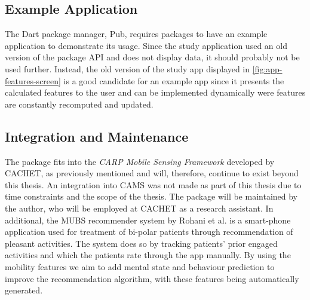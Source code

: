 \subsection{Example Application}
The Dart package manager, Pub, requires packages to have an example application to demonstrate its usage. Since the study application used an old version of the package API and does not display data, it should probably not be used further. Instead, the old version of the study app displayed in \ref{fig:app-features-screen} is a good candidate for an example app since it presents the calculated features to the user and can be implemented dynamically were features are constantly recomputed and updated.

\subsection{Integration and Maintenance}
The package fits into the \textit{CARP Mobile Sensing Framework} developed by CACHET, as previously mentioned and will, therefore, continue to exist beyond this thesis. An integration into CAMS was not made as part of this thesis due to time constraints and the scope of the thesis. The package will be maintained by the author, who will be employed at CACHET as a research assistant. In additional, the MUBS recommender system by Rohani et al. \cite{mubs-rohani} is a smart-phone application used for treatment of bi-polar patients through recommendation of pleasant activities. The system does so by tracking patients' prior engaged activities and which the patients rate through the app manually. By using the mobility features we aim to add mental state and behaviour prediction to improve the recommendation algorithm, with these features being automatically generated.